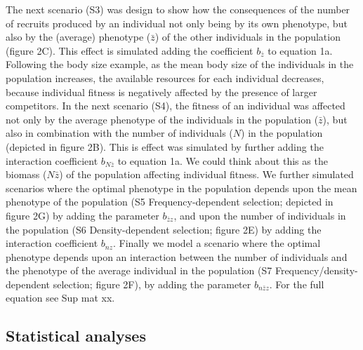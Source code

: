 \documentclass{article}
\begin{document}
The next scenario (S3) was design to show how the consequences of the number of recruits produced by an individual not only being by its own phenotype, but also by the (average) phenotype ($\bar{z}$) of the other individuals in the population (figure 2C). This effect is simulated adding the coefficient $b_{\bar{z}}$ to equation 1a. Following the body size example, as the mean body size of the individuals in the population increases, the available resources for each individual decreases, because individual fitness is negatively affected by the presence of larger competitors. In the next scenario (S4), the fitness of an individual was affected not only by the average phenotype of the individuals in the population ($\bar{z}$), but also in combination with the number of individuals ($N$) in the population (depicted in figure 2B). This is effect was simulated by further adding the interaction coefficient $b_{N\bar{z}}$ to equation 1a. We could think about this as the biomass (${N\bar{z}}$) of the population affecting individual fitness. We further simulated scenarios where the optimal phenotype in the population depends upon the mean phenotype of the population (S5 Frequency-dependent selection; depicted in figure 2G) by adding the parameter $b_{\bar{z}z}$, and upon the number of individuals in the population (S6 Density-dependent selection; figure 2E) by adding the interaction coefficient $b_{nz}$. Finally we model a scenario where the optimal phenotype depends upon an interaction between the number of individuals and the phenotype of the average individual in the population (S7 Frequency/density-dependent selection; figure 2F), by adding the parameter $b_{n\bar{z}z}$. For the full equation see Sup mat xx.


\subsection{Statistical analyses}
\end{document}
